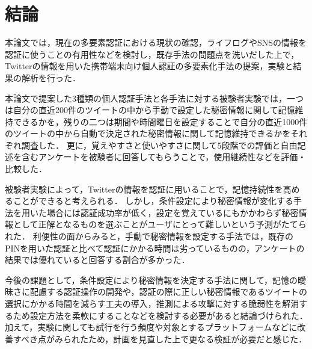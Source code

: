 \chapter{結論}\label{chap:conclusion}
本論文では，現在の多要素認証における現状の確認，ライフログやSNSの情報を認証に使うことの有用性などを検討し，既存手法の問題点を洗いだした上で，Twitterの情報を用いた携帯端末向け個人認証の多要素化手法の提案，実験と結果の解析を行った．

本論文で提案した3種類の個人認証手法と各手法に対する被験者実験では，一つは自分の直近200件のツイートの中から手動で設定した秘密情報に関して記憶維持できるかを，残りの二つは期間や時間曜日を設定することで自分の直近1000件のツイートの中から自動で決定された秘密情報に関して記憶維持できるかをそれぞれ調査した．
更に，覚えやすさと使いやすさに関して5段階での評価と自由記述を含むアンケートを被験者に回答してもらうことで，使用継続性などを評価・比較した．

被験者実験によって，Twitterの情報を認証に用いることで，記憶持続性を高めることができると考えられる．
しかし，条件設定により秘密情報が変化する手法を用いた場合には認証成功率が低く，設定を覚えているにもかかわらず秘密情報として正解となるものを選ぶことがユーザにとって難しいという予測がたてられた．
利便性の面からみると，手動で秘密情報を設定する手法では，既存のPINを用いた認証と比べて認証にかかる時間は劣っているものの，アンケートの結果では優れていると回答する割合が多かった．

今後の課題として，条件設定により秘密情報を決定する手法に関して，記憶の曖昧さに配慮する認証操作の開発や，認証の際に正しい秘密情報であるツイートの選択にかかる時間を減らす工夫の導入，推測による攻撃に対する脆弱性を解消するため設定方法を柔軟にすることなどを検討する必要があると結論づけられた．
加えて，実験に関しても試行を行う頻度や対象とするプラットフォームなどに改善すべき点がみられたため，計画を見直した上で更なる検証が必要だと感じた．

\newpage
